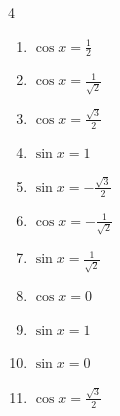 \begin{multicols}{4}
\begin{enumerate}
  \item $\displaystyle \cos{x}  = \frac{1}{2}$


  \item $\displaystyle \cos{x}  = \frac{1}{\sqrt{2}}$


  \item $\displaystyle \cos{x}  = \frac{\sqrt{3}}{2}$


  \item $\displaystyle \sin{x}  = 1$


  \item $\displaystyle \sin{x}  = -\frac{\sqrt{3}}{2}$


  \item $\displaystyle \cos{x}  = -\frac{1}{\sqrt{2}}$


  \item $\displaystyle \sin{x}  = \frac{1}{\sqrt{2}}$


  \item $\displaystyle \cos{x}  = 0$


  \item $\displaystyle \sin{x}  = 1$


\columnbreak %

\resetques

  \item $\displaystyle \sin{x}  = 0$

        \phantom{$\displaystyle x = 0 , \pi$}

  \item $\displaystyle \cos{x}  = \frac{\sqrt{3}}{2}$



\end{enumerate}
\end{multicols}
